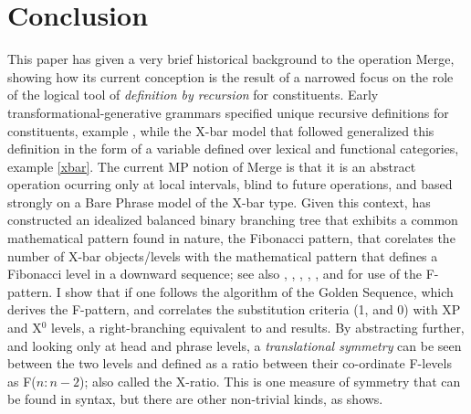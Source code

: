 \documentclass[11pt,twoside]{article}
\begin{document}
\section*{Conclusion}
This paper has given a very brief historical background to the operation Merge, showing how its current conception is the result of a narrowed focus on the role of the logical tool of \textsl{definition by recursion} for constituents. Early transformational-generative grammars specified unique recursive definitions for constituents, example , while the X-bar model that followed generalized this definition in the form of a variable defined over lexical and functional categories, example \ref{xbar}. The current MP notion of Merge is that it is an abstract operation ocurring only at local intervals, blind to future operations, and based strongly on a Bare Phrase model of the X-bar type. Given this context, \cite{medeiros:2008} has constructed an idealized balanced binary branching tree that exhibits a common mathematical pattern found in nature, the Fibonacci pattern, that corelates the number of X-bar objects/levels with the mathematical pattern that defines a Fibonacci level in a downward sequence; see also \cite{uriagereka:1998}, \cite{cm:2005}, \cite{bcm:2006}, \cite{idsardi:2008}, \cite{soschen:2008}, and \cite{ppuriagereka:2008} for use of the F-pattern. I show that if one follows the algorithm of the Golden Sequence, which derives the F-pattern, and correlates the substitution criteria (1, and 0) with XP and X$^{0}$ levels, a right-branching equivalent to \cite{medeiros:2008} and \cite{soschen:2008} results. By abstracting further, and looking only at head and phrase levels, a \textsl{translational symmetry} can be seen between the two levels and defined as a ratio between their co-ordinate F-levels as F($n : n-2$); also called the X-ratio. This is one measure of symmetry that can be found in syntax, but there are other non-trivial kinds, as \cite{boeckx08bare} shows. 
\end{document}
